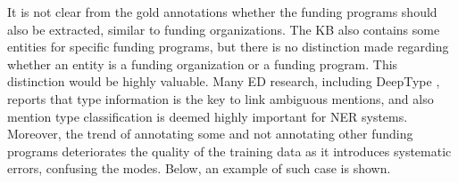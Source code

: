 \documentclass{report}
\theoremstyle{definition}
\theoremstyle{remark}
\begin{document}

It is not clear from the gold annotations whether the funding programs should also be extracted, similar to funding organizations. The KB also contains some entities for specific funding programs, but there is no distinction made regarding whether an entity is a funding organization or a funding program. This distinction would be highly valuable. Many ED research, including DeepType \cite{raiman}, reports that type information is the key to link ambiguous mentions, and also mention type classification is deemed highly important for NER systems. Moreover, the trend of annotating some and not annotating other funding programs deteriorates the quality of the training data as it introduces systematic errors, confusing the modes. Below, an example of such case is shown.

\begin{center}
\end{center}
\end{document}
